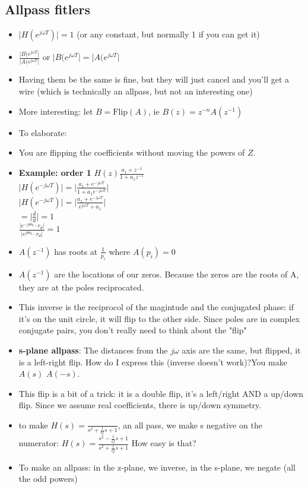 \subsection*{Allpass fitlers}
\begin{itemize}
\item{
$\vert H(e^{j\omega T}) \vert = 1$ (or any constant, but normally 1 if you can 
get it)
}
\item{
$
\frac{\vert B(e^{j\omega T} \vert}
{\vert A(e^{j\omega T} \vert}
$ or 
$\vert B(e^{j\omega T} \vert =
\vert A(e^{j\omega T} \vert$
}
\item{
Having them be the same is fine, but they will just cancel and you'll get 
a wire (which is technically an allpass, but not an interesting one)
}
\item{
More interesting: let $B = \mbox{Flip}(A)$, ie
$B(z) = z^{-n}A(z^{-1})$
}
\item{ 
To elaborate:
}
\item{
You are flipping the coefficients without moving the powers of $Z$.
}
\item{
\textbf{Example: order 1}
$H(z) \frac{a_1 + z^{-1}}{1 + a_1 z^{-1}}$\\
$\vert H(e^{-j\omega T}) \vert =
\vert \frac{a_1 + e^{-j \omega T}}{1 + a_1 e^{-j\omega T}}\vert$\\

$\vert H(e^{-j\omega T}) \vert =
\vert 
\frac{a_1 + e^{-j \omega T}}{
e^{j\omega T} + a_1
}
\vert
$\\
$ = \vert \frac{\overline{d}}{d} \vert = 1 
$\\
$\frac{
\vert e^{-j\Theta_d}\cdot r_d \vert
}{
\vert e^{j\Theta_d}\cdot r_d \vert
} = 1$
}
\item{
$A(z^{-1})$ has roots at $\frac{1}{p_i}$ where $A(p_i) = 0$
}
\item{
$A(z^{-1})$ are the locations of our zeros. Because the zeros
are the roots of A, they are at the poles reciprocated.
}
\item{
This inverse is the reciprocol of the magintude and the 
conjugated phase: if it's on the unit circle, it will flip
to the other side. Since poles are in complex conjugate 
pairs, you don't really need to think about the "flip"
}
\item{
\textbf{s-plane allpass}:
The distances from the $j\omega$ axis are the same, but flipped,
it is a left-right flip. How do I express this (inverse doesn't work)?You make $A(s)$ $A(-s)$. 
}
\item{
This flip is a bit of a trick: it is a double flip, it's a left/right AND a up/down flip. Since we assume real coefficients, there is
up/down symmetry. 
}
\item{
to make $H(s) = \frac{}{s^2 + \frac{1}{Q}s + 1}$, an all pass, we make s
negative on the numerator:
$H(s) = \frac{s^2 - \frac{1}{Q}s + 1}{s^2 + \frac{1}{Q}s + 1}$
How easy is that?
}
\item{To make an allpass: in the z-plane, we inverse, in the s-plane, we negate (all the odd powers)}
\end{itemize}

